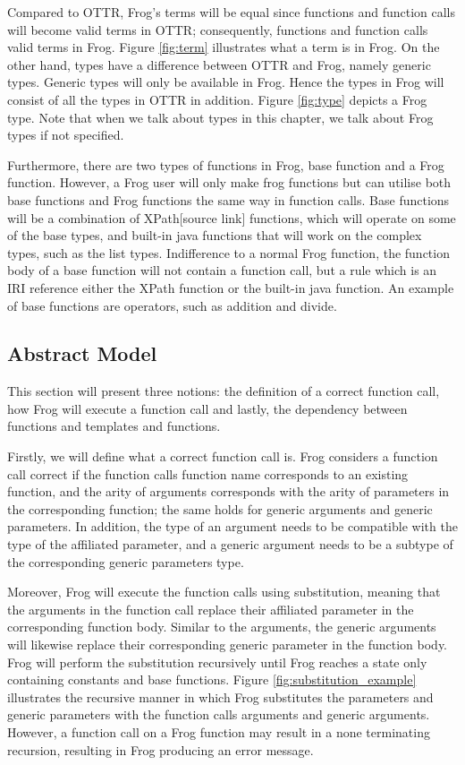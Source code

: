 \para
Compared to OTTR, Frog's terms will be equal since functions and function calls will become valid terms in OTTR; consequently, functions and function calls valid terms in Frog. Figure \ref{fig:term} illustrates what a term is in Frog. On the other hand, types have a difference between OTTR and Frog, namely generic types. Generic types will only be available in Frog. Hence the types in Frog will consist of all the types in OTTR in addition. Figure \ref{fig:type} depicts a Frog type. Note that when we talk about types in this chapter, we talk about Frog types if not specified.

\para
Furthermore, there are two types of functions in Frog, base function and a Frog function. However, a Frog user will only make frog functions but can utilise both base functions and Frog functions the same way in function calls. Base functions will be a combination of XPath[source link] functions, which will operate on some of the base types, and built-in java functions that will work on the complex types, such as the list types. Indifference to a normal Frog function, the function body of a base function will not contain a function call, but a rule which is an IRI reference either the XPath function or the built-in java function. An example of base functions are operators, such as addition and divide.

\subsection{Abstract Model}
This section will present three notions: the definition of a correct function call, how Frog will execute a function call and lastly, the dependency between functions and templates and functions. 

\para
Firstly, we will define what a correct function call is. Frog considers a function call correct if the function calls function name corresponds to an existing function, and the arity of arguments corresponds with the arity of parameters in the corresponding function; the same holds for generic arguments and generic parameters. In addition, the type of an argument needs to be compatible with the type of the affiliated parameter, and a generic argument needs to be a subtype of the corresponding generic parameters type.

\para
Moreover, Frog will execute the function calls using substitution, meaning that the arguments in the function call replace their affiliated parameter in the corresponding function body. Similar to the arguments, the generic arguments will likewise replace their corresponding generic parameter in the function body. Frog will perform the substitution recursively until Frog reaches a state only containing constants and base functions. Figure \ref{fig:substitution_example} illustrates the recursive manner in which Frog substitutes the parameters and generic parameters with the function calls arguments and generic arguments. However, a function call on a Frog function may result in a none terminating recursion, resulting in Frog producing an error message.

